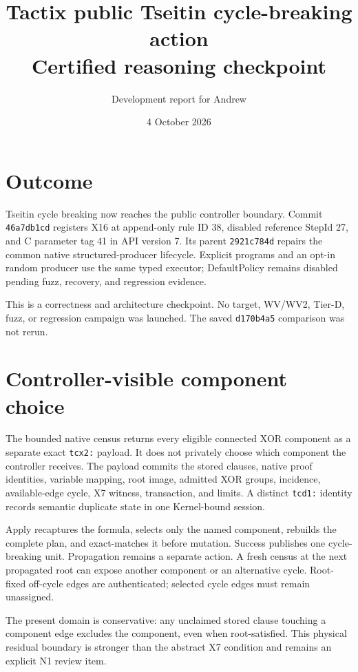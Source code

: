 \documentclass[11pt]{article}
\title{Tactix public Tseitin cycle-breaking action\\Certified reasoning checkpoint}
\author{Development report for Andrew}
\date{4 October 2026}
\newcommand{\code}[1]{\texttt{#1}}
\begin{document}
\maketitle

\section*{Outcome}

Tseitin cycle breaking now reaches the public controller boundary. Commit
\code{46a7db1cd} registers X16 at append-only rule ID 38, disabled reference
StepId 27, and C parameter tag 41 in API version 7. Its parent
\code{2921c784d} repairs the common native structured-producer lifecycle.
Explicit programs and an opt-in random producer use the same typed executor;
DefaultPolicy remains disabled pending fuzz, recovery, and regression evidence.

This is a correctness and architecture checkpoint. No target, WV/WV2, Tier-D,
fuzz, or regression campaign was launched. The saved \code{d170b4a5}
comparison was not rerun.

\section*{Controller-visible component choice}

The bounded native census returns every eligible connected XOR component as a
separate exact \code{tcx2:} payload. It does not privately choose which
component the controller receives. The payload commits the stored clauses,
native proof identities, variable mapping, root image, admitted XOR groups,
incidence, available-edge cycle, X7 witness, transaction, and limits. A
distinct \code{tcd1:} identity records semantic duplicate state in one
Kernel-bound session.

Apply recaptures the formula, selects only the named component, rebuilds the
complete plan, and exact-matches it before mutation. Success publishes one
cycle-breaking unit. Propagation remains a separate action. A fresh census at
the next propagated root can expose another component or an alternative cycle.
Root-fixed off-cycle edges are authenticated; selected cycle edges must remain
unassigned.

The present domain is conservative: any unclaimed stored clause touching a
component edge excludes the component, even when root-satisfied. This physical
residual boundary is stronger than the abstract X7 condition and remains an
explicit N1 review item.
\end{document}
